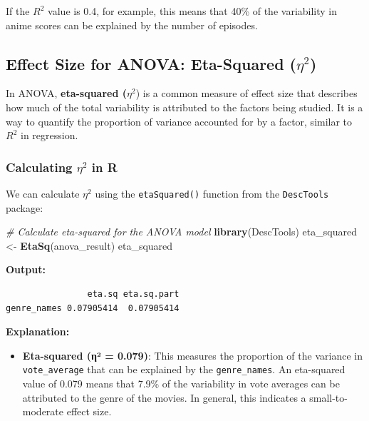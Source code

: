 \documentclass[
]{book}
\newenvironment{Shaded}{\begin{snugshade}}{\end{snugshade}}
\newcommand{\CommentTok}[1]{\textcolor[rgb]{0.56,0.35,0.01}{\textit{#1}}}
\newcommand{\FunctionTok}[1]{\textcolor[rgb]{0.13,0.29,0.53}{\textbf{#1}}}
\newcommand{\NormalTok}[1]{#1}
\newcommand{\OtherTok}[1]{\textcolor[rgb]{0.56,0.35,0.01}{#1}}
\providecommand{\tightlist}{%
  \setlength{\itemsep}{0pt}\setlength{\parskip}{0pt}}
\begin{document}
If the \(R^2\) value is 0.4, for example, this means that 40\% of the variability in anime scores can be explained by the number of episodes.

\subsection*{\texorpdfstring{Effect Size for ANOVA: Eta-Squared (\(\eta^2\))}{Effect Size for ANOVA: Eta-Squared (\textbackslash eta\^{}2)}}\label{effect-size-for-anova-eta-squared-eta2}

In ANOVA, \textbf{eta-squared (}\(\eta^2\)) is a common measure of effect size that describes how much of the total variability is attributed to the factors being studied. It is a way to quantify the proportion of variance accounted for by a factor, similar to \(R^2\) in regression.

\subsubsection*{\texorpdfstring{Calculating \(\eta^2\) in R}{Calculating \textbackslash eta\^{}2 in R}}\label{calculating-eta2-in-r}

We can calculate \(\eta^2\) using the \texttt{etaSquared()} function from the \texttt{DescTools} package:

\begin{Shaded}
\begin{Highlighting}[]
\CommentTok{\# Calculate eta{-}squared for the ANOVA model}
\FunctionTok{library}\NormalTok{(DescTools)}
\NormalTok{eta\_squared }\OtherTok{\textless{}{-}} \FunctionTok{EtaSq}\NormalTok{(anova\_result)}
\NormalTok{eta\_squared}
\end{Highlighting}
\end{Shaded}

\textbf{Output:}

\begin{verbatim}
                eta.sq eta.sq.part
genre_names 0.07905414  0.07905414
\end{verbatim}

\textbf{Explanation:}

\begin{itemize}
\tightlist
\item
  \textbf{Eta-squared (η² = 0.079)}: This measures the proportion of the variance in \texttt{vote\_average} that can be explained by the \texttt{genre\_names}. An eta-squared value of 0.079 means that 7.9\% of the variability in vote averages can be attributed to the genre of the movies. In general, this indicates a small-to-moderate effect size.
\end{itemize}
\end{document}
